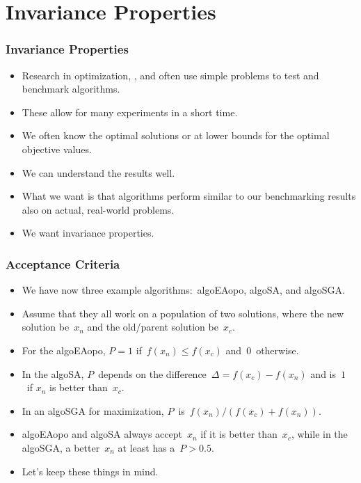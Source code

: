 \documentclass[aspectratio=169,mathserif,notheorems]{beamer}%
\begin{document}
\section{Invariance Properties}%
%
\begin{frame}%
\frametitle{Invariance Properties}%
\begin{itemize}%
\item Research in optimization, , and  often use simple problems to test and benchmark algorithms.%
\item<2-> These allow for many experiments in a short time.%
\item<3-> We often know the optimal solutions or at lower bounds for the optimal objective values.%
\item<4-> We can understand the results well.%
\item<5-> What we want is that algorithms perform similar to our benchmarking results also on actual, real-world problems.%
\item<6-> \alert{We want invariance properties.}\cite{OAAH2017IGOAAUPVIP,HA2014PDOCSSFTTP,JA2010LLCOTSIMMLEAOMFIRFLPS}%
\end{itemize}%
\end{frame}%
%
\begin{frame}%
\frametitle{Acceptance Criteria}%
\begin{itemize}%
\item We have now three example algorithms:~\gls{algoEAopo}, \gls{algoSA}, and \gls{algoSGA}.%
%
\item<2-> Assume that they all work on a population of two solutions, where the new solution be~$x_n$ and the old/parent solution be~$x_c$.%
%
\item<4-> For the \gls{algoEAopo}, $P=1$ if~$f(x_n)\leq f(x_c)$ and~$0$~otherwise.%
%
\item<5-> In the \gls{algoSA}, $P$~depends on the difference~$\Delta=f(x_c)-f(x_n)$ and is~$1$~if $x_n$ is better than~$x_c$.%
%
\item<6-> In an \gls{algoSGA} for maximization, $P$~is~$f(x_n)/(f(x_c)+f(x_n))$.%
%
\item<8-> \gls{algoEAopo} and \gls{algoSA} always accept~$x_n$ if it is better than~$x_c$, while in the \gls{algoSGA}, a better~$x_n$ at least has a~$P>0.5$.%
%
\item<9-> Let's keep these things in mind.%
\end{itemize}%
\end{frame}%
\end{document}

